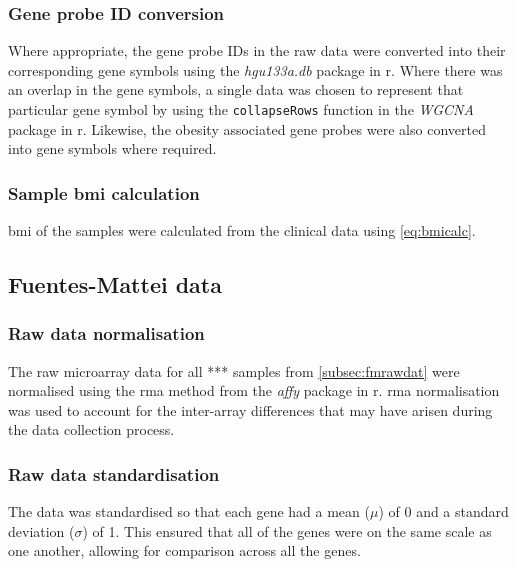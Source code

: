 \subsubsection{\textbf{Gene probe ID conversion}}

Where appropriate, the gene probe IDs in the raw data were converted into their corresponding gene symbols using the \textit{hgu133a.db} package in \gls{r}.
Where there was an overlap in the gene symbols, a single data was chosen to represent that particular gene symbol by using the \texttt{collapseRows} function in the \textit{WGCNA} package in \gls{r}.
Likewise, the obesity associated gene probes were also converted into gene symbols where required.

\subsubsection{\textbf{Sample \gls{bmi} calculation}}

\gls{bmi} of the samples were calculated from the clinical data using \cref{eq:bmicalc}.

\subsection{Fuentes-Mattei data}
\label{subsec:fmdatproc}


\subsubsection{\textbf{Raw data normalisation}}

The raw microarray data for all *** samples from \cref{subsec:fmrawdat} were normalised using the \gls{rma} method from the \textit{affy} package in \gls{r}.
\gls{rma} normalisation was used to account for the inter-array differences that may have arisen during the data collection process.

\subsubsection{\textbf{Raw data standardisation}}

The data was standardised so that each gene had a mean ($\mu$) of 0 and a standard deviation ($\sigma$) of 1.
This ensured that all of the genes were on the same scale as one another, allowing for comparison across all the genes.

